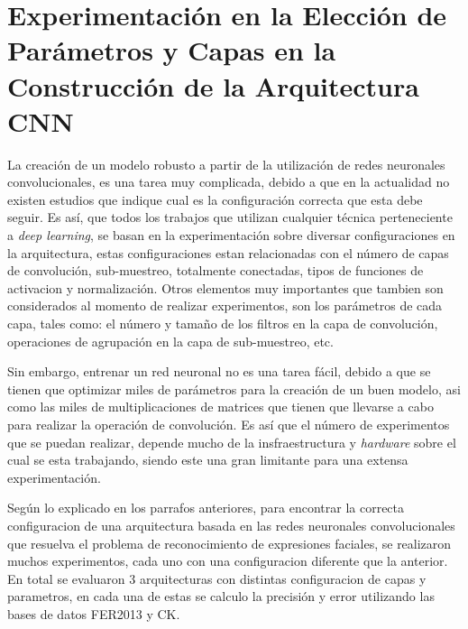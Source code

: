 \section{Experimentación en la Elección de Parámetros y Capas en la Construcción de la Arquitectura CNN}
\label{sec:experiment}
La creación de un modelo robusto a partir de la utilización de redes neuronales convolucionales, es una tarea muy complicada, debido a que en la actualidad no existen estudios que indique cual es la configuración correcta que esta debe seguir. Es así, que todos los trabajos que utilizan cualquier técnica perteneciente a \textit{deep learning}, se basan en la experimentación sobre diversar configuraciones en la arquitectura, estas configuraciones estan relacionadas con el número de capas de convolución, sub-muestreo, totalmente conectadas, tipos de funciones de activacion y normalización. Otros elementos muy importantes que tambien son considerados al momento de realizar experimentos, son los parámetros de cada capa, tales como: el número y tamaño de los filtros en la capa de convolución, operaciones de agrupación en la capa de sub-muestreo, etc.

Sin embargo, entrenar un red neuronal no es una tarea fácil, debido a que se tienen que optimizar miles de parámetros para la creación de un buen modelo, asi como las miles de multiplicaciones de matrices que tienen que llevarse a cabo para realizar la operación de convolución. Es así que el número de experimentos que se puedan realizar, depende mucho de la insfraestructura y \textit{hardware} sobre el cual se esta trabajando, siendo este una gran limitante para una extensa experimentación.

Según lo explicado en los parrafos anteriores, para encontrar la correcta configuracion de una arquitectura basada en las redes neuronales convolucionales que resuelva el problema de reconocimiento de expresiones faciales, se realizaron muchos experimentos, cada uno con una configuracion diferente que la anterior. En total se evaluaron 3 arquitecturas con distintas configuracion de capas y parametros, en cada una de estas se calculo la precisión y error utilizando las bases de datos FER2013 y CK.




